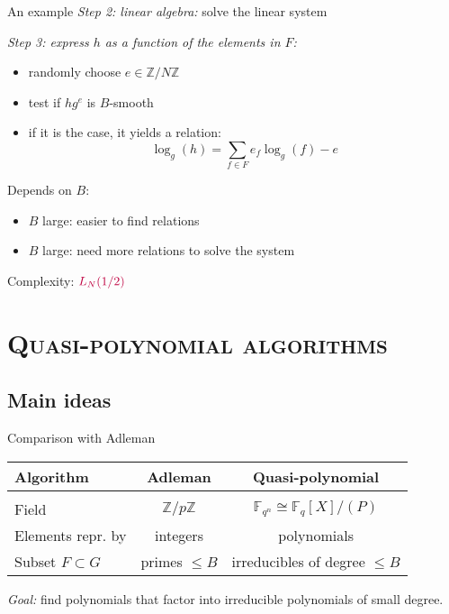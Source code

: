 \documentclass[xcolor=x11names,compress]{beamer}
\theoremstyle{break}
\theoremstyle{sc}
\theoremstyle{definition}
\theoremstyle{remark}
\begin{document}
\begin{frame}{An example}
  \emph{Step 2: linear algebra:} solve the linear system
  
  \emph{Step 3: express $h$ as a function of the elements in $F$:}
  \begin{itemize}
     \item randomly choose $e\in \mathbb{Z}/N\mathbb{Z}$
    \item test if $hg^e$ is $B$-smooth
    \item if it is the case, it yields a relation:
     \[
      \log_g(h) = \sum_{f\in F}e_f\log_g(f) - e
      \]
  \end{itemize}

 Depends on $B$:
  \begin{itemize}
    \item $B$ large: easier to find relations
    \item $B$ large: need more relations to solve the system
  \end{itemize}
  Complexity: $\textcolor{purple}{L_N(1/2)}$

\end{frame}

\section{\scshape Quasi-polynomial algorithms} 
\subsection{Main ideas}
\begin{frame}{Comparison with Adleman}
  \begin{center}
  \begin{tabular}[here]{lcc}
  Algorithm  & Adleman & Quasi-polynomial \\
  \hline
  & & \\
  Field & $\mathbb{Z}/p\mathbb{Z}$ & $\mathbb{F}_{q^n}\cong \mathbb{F}_q[X]/(P)$ \\
  Elements repr. by & integers & polynomials \\
  Subset $F\subset G$ & primes $\leq B$ & irreducibles of degree $\leq B$ \\
  \end{tabular}
  \end{center}

  \emph{Goal:} find polynomials that factor into irreducible polynomials of small degree.
\end{frame}
\end{document}
